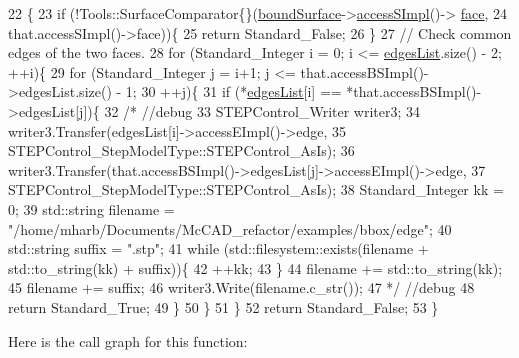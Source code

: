 \begin{DoxyCode}
22                                                                            \{
23     \textcolor{keywordflow}{if} (!Tools::SurfaceComparator\{\}(\hyperlink{classMcCAD_1_1Geometry_1_1BoundSurface_1_1Impl_a6e9a9a98f22310d56cf46937aca346e3}{boundSurface}->\hyperlink{classMcCAD_1_1Geometry_1_1Surface_a989de1f9ebe3de043412014ed25e52eb}{accessSImpl}()->
      \hyperlink{classMcCAD_1_1Geometry_1_1Surface_1_1Impl_abf7c4dc859404ce42b425c7d6b578f69}{face},
24                                     that.accessSImpl()->face))\{
25       \textcolor{keywordflow}{return} Standard\_False;
26     \}
27     \textcolor{comment}{// Check common edges of the two faces.}
28     \textcolor{keywordflow}{for} (Standard\_Integer i = 0; i <= \hyperlink{classMcCAD_1_1Geometry_1_1BoundSurface_1_1Impl_a92e901c25606e27f9d11e0837c096f59}{edgesList}.size() - 2; ++i)\{
29         \textcolor{keywordflow}{for} (Standard\_Integer j = i+1; j <= that.accessBSImpl()->edgesList.size() - 1;
30              ++j)\{
31             \textcolor{keywordflow}{if} (*\hyperlink{classMcCAD_1_1Geometry_1_1BoundSurface_1_1Impl_a92e901c25606e27f9d11e0837c096f59}{edgesList}[i] == *that.accessBSImpl()->edgesList[j])\{
32                 \textcolor{comment}{/* //debug}
33 \textcolor{comment}{                STEPControl\_Writer writer3;}
34 \textcolor{comment}{                writer3.Transfer(edgesList[i]->accessEImpl()->edge,}
35 \textcolor{comment}{                                 STEPControl\_StepModelType::STEPControl\_AsIs);}
36 \textcolor{comment}{                writer3.Transfer(that.accessBSImpl()->edgesList[j]->accessEImpl()->edge,}
37 \textcolor{comment}{                                 STEPControl\_StepModelType::STEPControl\_AsIs);}
38 \textcolor{comment}{                Standard\_Integer kk = 0;}
39 \textcolor{comment}{                std::string filename = "/home/mharb/Documents/McCAD\_refactor/examples/bbox/edge";}
40 \textcolor{comment}{                std::string suffix = ".stp";}
41 \textcolor{comment}{                while (std::filesystem::exists(filename + std::to\_string(kk) + suffix))\{}
42 \textcolor{comment}{                    ++kk;}
43 \textcolor{comment}{                \}}
44 \textcolor{comment}{                filename += std::to\_string(kk);}
45 \textcolor{comment}{                filename += suffix;}
46 \textcolor{comment}{                writer3.Write(filename.c\_str());}
47 \textcolor{comment}{                */} \textcolor{comment}{//debug}
48                 \textcolor{keywordflow}{return} Standard\_True;
49             \}
50         \}
51     \}
52     \textcolor{keywordflow}{return} Standard\_False;
53 \}
\end{DoxyCode}
Here is the call graph for this function\+:
\mbox{\label{classMcCAD_1_1Geometry_1_1BoundSurface_1_1Impl_af5148dae00248364c869ac60e144afba}} 
